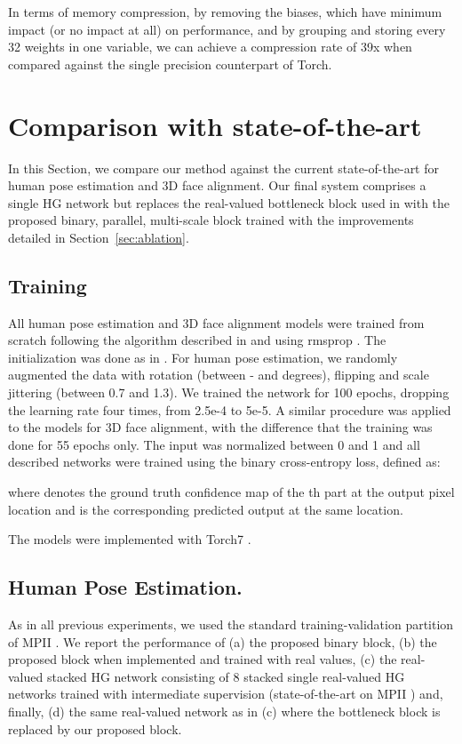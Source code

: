 \documentclass[10pt,journal,compsoc]{IEEEtran}
\begin{document}
In terms of memory compression, by removing the biases, which have minimum impact (or no impact at all) on performance, and by grouping and storing every 32 weights in one variable, we can achieve a compression rate of 39x when compared against the single precision counterpart of Torch.

\section{Comparison with state-of-the-art} \label{sec:results}

In this Section, we compare our method against the current state-of-the-art for human pose estimation and 3D face alignment. Our final system comprises a single HG network but replaces the real-valued bottleneck block used in \cite{newell2016stacked} with the proposed binary, parallel, multi-scale block trained with the improvements detailed in Section~\ref{sec:ablation}. 

\subsection{Training} \label{sec:training}

All human pose estimation and 3D face alignment models were trained from scratch following the algorithm described in \cite{rastegari2016xnor} and using rmsprop \cite{tieleman2012lecture}. The initialization was done as in \cite{he2016deep}. For human pose estimation, we randomly augmented the data with rotation (between - and  degrees), flipping and scale jittering (between 0.7 and 1.3). We  trained the network for 100 epochs, dropping the learning rate four times, from 2.5e-4 to 5e-5. A similar procedure was applied to the models for 3D face alignment, with the difference that the training was done for 55 epochs only. The input was normalized between 0 and 1 and all described networks were trained using the binary cross-entropy loss, defined as:


where  denotes the ground truth confidence map of the th part at the output pixel location  and  is the corresponding predicted output at the same location.

The models were implemented with Torch7 \cite{collobert2011torch7}.

\subsection{Human Pose Estimation.} As in all previous experiments, we used the standard training-validation partition of MPII \cite{bulat2016human,newell2016stacked}. We report the performance of (a) the proposed binary block, (b) the proposed block when implemented and trained with real values, (c) the real-valued stacked HG network consisting of 8 stacked single real-valued HG networks trained with intermediate supervision (state-of-the-art on MPII {\cite{newell2016stacked}}) and, finally, (d) the same real-valued network as in (c) where the bottleneck block is replaced by our proposed block.
\end{document}
